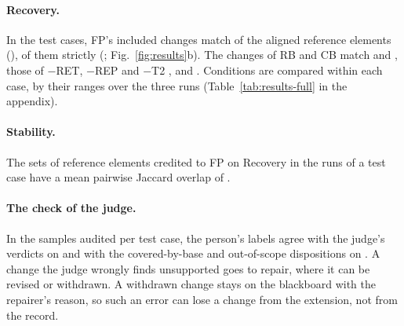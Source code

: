 \paragraph{Recovery.} In the test cases, FP's included changes match  of the
 aligned reference elements (),  of them
strictly (; Fig.~\ref{fig:results}b). The changes of RB and CB match
 and , those of $-$RET, $-$REP and $-$T2 ,
 and . Conditions are compared within each case, by their
ranges over the three runs (Table~\ref{tab:results-full} in the appendix). %

\paragraph{Stability.} The sets of reference elements credited to FP on Recovery in the runs of a test case have a
mean pairwise Jaccard overlap of . 

\paragraph{The check of the judge.} In the samples audited per test case, the person's labels agree with the %
judge's verdicts on  and with the covered-by-base and out-of-scope dispositions on
. 
A change the judge wrongly finds unsupported goes to repair, where it can be revised or withdrawn. A withdrawn %
change stays on the blackboard with the repairer's reason, so such an error can lose a change from the extension, %
not from the record.


